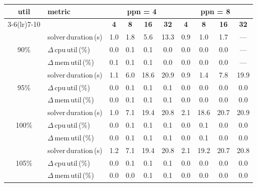 \begin{tabular}{@{}c l *{8}{c}@{}}
\toprule
\multirow{2}{*}{\textbf{util}} & \multirow{2}{*}{\textbf{metric}} &\multicolumn{4}{c}{\textbf{ppn = 4}} & \multicolumn{4}{c}{\textbf{ppn = 8}}\\
\cmidrule(lr){3-6}\cmidrule(lr){7-10}
 &  & \textbf{4} & \textbf{8} & \textbf{16} & \textbf{32} & \textbf{4} & \textbf{8} & \textbf{16} & \textbf{32}\\
\midrule
\multirow{3}{*}{90\%}
& solver\,duration\,(s) & 1.0 & 1.8 & 5.6 & 13.3 & 0.9 & 1.0 & 1.7 & \multicolumn{1}{c}{—} \\
& $\Delta$\,cpu\,util\,(\%) & 0.0 & 0.1 & 0.1 & 0.0 & 0.0 & 0.0 & 0.0 & \multicolumn{1}{c}{—} \\
& $\Delta$\,mem\,util\,(\%) & 0.1 & 0.1 & 0.1 & 0.0 & 0.0 & 0.0 & 0.0 & \multicolumn{1}{c}{—} \\
\midrule
\multirow{3}{*}{95\%}
& solver\,duration\,(s) & 1.1 & 6.0 & 18.6 & 20.9 & 0.9 & 1.4 & 7.8 & 19.9 \\
& $\Delta$\,cpu\,util\,(\%) & 0.0 & 0.1 & 0.1 & 0.1 & 0.0 & 0.0 & 0.0 & 0.0 \\
& $\Delta$\,mem\,util\,(\%) & 0.0 & 0.1 & 0.1 & 0.1 & 0.0 & 0.0 & 0.0 & 0.0 \\
\midrule
\multirow{3}{*}{100\%}
& solver\,duration\,(s) & 1.0 & 7.1 & 19.4 & 20.8 & 2.1 & 18.6 & 20.7 & 20.9 \\
& $\Delta$\,cpu\,util\,(\%) & 0.0 & 0.1 & 0.1 & 0.1 & 0.0 & 0.1 & 0.0 & 0.0 \\
& $\Delta$\,mem\,util\,(\%) & 0.0 & 0.1 & 0.1 & 0.1 & 0.0 & 0.1 & 0.0 & 0.0 \\
\midrule
\multirow{3}{*}{105\%}
& solver\,duration\,(s) & 1.2 & 7.1 & 19.4 & 20.8 & 2.1 & 19.2 & 20.7 & 20.8 \\
& $\Delta$\,cpu\,util\,(\%) & 0.0 & 0.1 & 0.1 & 0.1 & 0.0 & 0.0 & 0.0 & 0.0 \\
& $\Delta$\,mem\,util\,(\%) & 0.0 & 0.0 & 0.1 & 0.1 & 0.0 & 0.0 & 0.0 & 0.0 \\
\bottomrule
\end{tabular}
